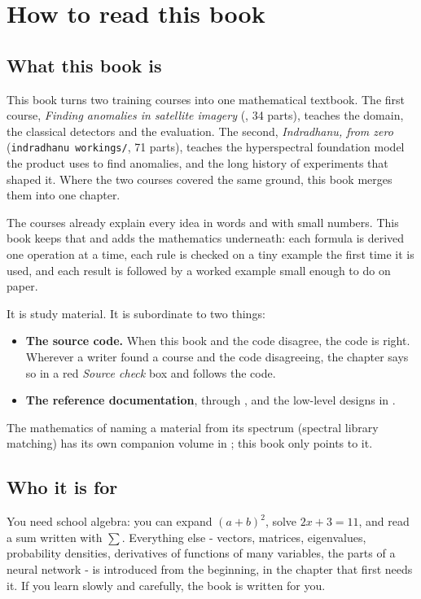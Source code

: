 \chapter{How to read this book}\label{ch:howtoread}

\section*{What this book is}

This book turns two training courses into one mathematical textbook. The first course,
\emph{Finding anomalies in satellite imagery} (, 34 parts),
teaches the domain, the classical detectors and the evaluation. The second,
\emph{Indradhanu, from zero} (\texttt{indradhanu workings/}, 71 parts), teaches the hyperspectral
foundation model the product uses to find anomalies, and the long history of experiments that
shaped it. Where the two courses covered the same ground, this book merges them into one chapter.

The courses already explain every idea in words and with small numbers. This book keeps that
and adds the mathematics underneath: each formula is derived one operation at a time, each rule
is checked on a tiny example the first time it is used, and each result is followed by a worked
example small enough to do on paper.

It is study material. It is subordinate to two things:
\begin{itemize}
  \item \textbf{The source code.} When this book and the code disagree, the code is right.
    Wherever a writer found a course and the code disagreeing, the chapter says so in a red
    \emph{Source check} box and follows the code.
  \item \textbf{The reference documentation},  through
    , and the low-level designs in .
\end{itemize}
The mathematics of naming a material from its spectrum (spectral library matching) has its own
companion volume in ; this book only points to it.

\section*{Who it is for}

You need school algebra: you can expand $(a+b)^2$, solve $2x + 3 = 11$, and read a sum written
with $\sum$. Everything else - vectors, matrices, eigenvalues, probability densities, derivatives
of functions of many variables, the parts of a neural network - is introduced from the beginning,
in the chapter that first needs it. If you learn slowly and carefully, the book is written for you.

